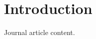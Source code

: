 \documentclass[config/load-project=false,document/type=paper,metadata/author={INSR Example Author},metadata/institution={INSR Example Institution},metadata/title={Journal Article Example},metadata/short-title={Journal Example},publication/profile={journal},publication/type={Journal manuscript},publication/doi={10.0000/example.doi},publication/license={CC BY 4.0}]{insr}
\begin{document}
\INSRMakeTitle\section{Introduction}Journal article content.
\end{document}
